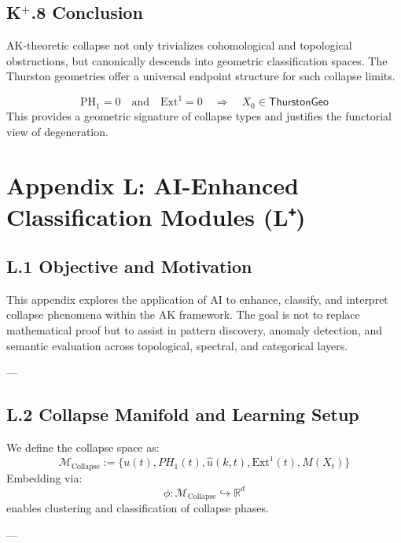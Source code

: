 \documentclass[11pt]{article}
\begin{document}
\begin{axiom}
\begin{axiom}
\subsection*{K$^+$.8 Conclusion}

AK-theoretic collapse not only trivializes cohomological and topological obstructions,  
but canonically descends into geometric classification spaces.  
The Thurston geometries offer a universal endpoint structure for such collapse limits.

\[
\boxed{
\mathrm{PH}_1 = 0 \quad \text{and} \quad \mathrm{Ext}^1 = 0 \quad \Rightarrow \quad X_0 \in \mathsf{ThurstonGeo}
}
\]
This provides a geometric signature of collapse types and justifies the functorial view of degeneration.





\section*{Appendix L: AI-Enhanced Classification Modules (L⁺)}

\subsection*{L.1 Objective and Motivation}

This appendix explores the application of AI to enhance, classify, and interpret collapse phenomena within the AK framework.  
The goal is not to replace mathematical proof but to assist in pattern discovery, anomaly detection, and semantic evaluation  
across topological, spectral, and categorical layers.

---

\subsection*{L.2 Collapse Manifold and Learning Setup}

We define the collapse space as:
\[
\mathcal{M}_{\text{Collapse}} := \{ u(t), PH_1(t), \widehat{u}(k,t), \mathrm{Ext}^1(t), M(X_t) \}
\]
Embedding via:
\[
\phi: \mathcal{M}_{\text{Collapse}} \hookrightarrow \mathbb{R}^d
\]
enables clustering and classification of collapse phases.

---


\end{axiom}
\end{axiom}
\end{document}
